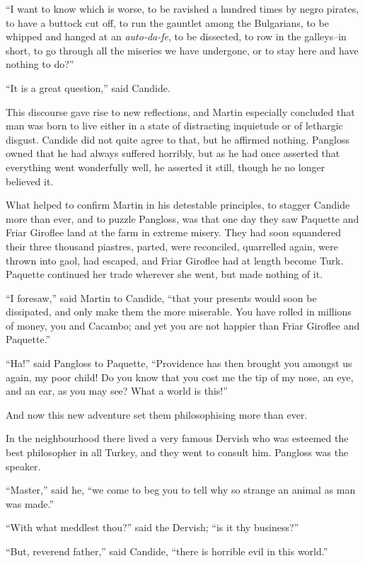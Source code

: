 ``I want to know which is worse, to be ravished a hundred times by negro pirates, to have a buttock cut off, to run the gauntlet among the Bulgarians, to be whipped and hanged at an \textit{auto-da-fe}, to be dissected, to row in the galleys--in short, to go through all the miseries we have undergone, or to stay here and have nothing to do?''

``It is a great question,'' said Candide.

This discourse gave rise to new reflections, and Martin especially concluded that man was born to live either in a state of distracting inquietude or of lethargic disgust. Candide did not quite agree to that, but he affirmed nothing. Pangloss owned that he had always suffered horribly, but as he had once asserted that everything went wonderfully well, he asserted it still, though he no longer believed it.

What helped to confirm Martin in his detestable principles, to stagger Candide more than ever, and to puzzle Pangloss, was that one day they saw Paquette and Friar Giroflee land at the farm in extreme misery. They had soon squandered their three thousand piastres, parted, were reconciled, quarrelled again, were thrown into gaol, had escaped, and Friar Giroflee had at length become Turk. Paquette continued her trade wherever she went, but made nothing of it.

``I foresaw,'' said Martin to Candide, ``that your presents would soon be dissipated, and only make them the more miserable. You have rolled in millions of money, you and Cacambo; and yet you are not happier than Friar Giroflee and Paquette.''

``Ha!'' said Pangloss to Paquette, ``Providence has then brought you amongst us again, my poor child! Do you know that you cost me the tip of my nose, an eye, and an ear, as you may see? What a world is this!''

And now this new adventure set them philosophising more than ever.

In the neighbourhood there lived a very famous Dervish who was esteemed the best philosopher in all Turkey, and they went to consult him. Pangloss was the speaker.

``Master,'' said he, ``we come to beg you to tell why so strange an animal as man was made.''

``With what meddlest thou?'' said the Dervish; ``is it thy business?''

``But, reverend father,'' said Candide, ``there is horrible evil in this world.''

